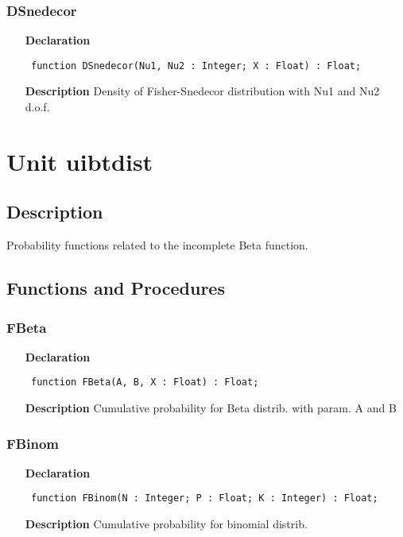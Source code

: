 \documentclass[12pt,a4paper,oneside]{report}
\newcommand{\declarationitem}[1]{\textbf{#1}}
\newcommand{\descriptiontitle}[1]{\textbf{#1}}
\newcommand{\code}[1]{\texttt{#1}}
\begin{document}
\subsubsection{DSnedecor}
\label{ugamdist-DSnedecor}
\begin{itemize}\item[\declarationitem{Declaration}\hfill]
	\begin{flushleft}
		\code{
			function DSnedecor(Nu1, Nu2 : Integer; X : Float) : Float;}
	\end{flushleft}
	\item[\descriptiontitle{Description}]
	Density of Fisher{-}Snedecor distribution with Nu1 and Nu2 d.o.f.
\end{itemize}
\section{Unit uibtdist}
\label{uibtdist}
\subsection{Description}
Probability functions related to the incomplete Beta function.
\subsection{Functions and Procedures}
\subsubsection{FBeta}
\label{uibtdist-FBeta}
\begin{itemize}\item[\declarationitem{Declaration}\hfill]
	\begin{flushleft}
		\code{
			function FBeta(A, B, X : Float) : Float;}
	\end{flushleft}
	\item[\descriptiontitle{Description}]
	Cumulative probability for Beta distrib. with param. A and B
\end{itemize}
\subsubsection{FBinom}
\label{uibtdist-FBinom}
\begin{itemize}\item[\declarationitem{Declaration}\hfill]
	\begin{flushleft}
		\code{
			function FBinom(N : Integer; P : Float; K : Integer) : Float;}
	\end{flushleft}
	\item[\descriptiontitle{Description}]
	Cumulative probability for binomial distrib.
\end{itemize}
\end{document}
